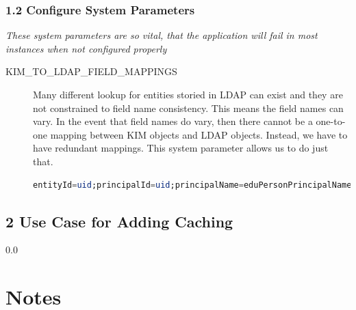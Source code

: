\subsubsection*{1.2 Configure System Parameters}
\emph{These system parameters are so vital, that the application will fail
in most instances when not configured properly}
\begin{description}
\item [KIM\_TO\_LDAP\_FIELD\_MAPPINGS] Many different lookup for
  entities storied in LDAP can exist and they are not constrained to
  field name consistency. This means the field names can vary. In the
  event that field names do vary, then there cannot be a one-to-one
  mapping between KIM objects and LDAP objects. Instead, we have to
  have redundant mappings. This system parameter allows us to do just that.

\begin{lstlisting}[language=sql,basicstyle=\scriptsize,backgroundcolor=\color{ubergray},caption={trnapp-config.xml},frame=single,breaklines=true]
entityId=uid;principalId=uid;principalName=eduPersonPrincipalName;givenName=sn;principals.principalName=eduPersonPrincipalName;persons.principalName=eduPersonPrincipalName;principals.principalId=uid;principals.active=employeeStatus;lastName=sn;firstName=givenName;employmentInformation.employeeStatus=employeeStatus;employmentInformation.employeeId=emplId,facultyId;names.lastName=sn;names.firstName=givenName;employmentInformation.employeeStatusCode=employeeStatus;
\end{lstlisting}
\end{description}

\subsection*{2 Use Case for Adding Caching}

\newpage
{\setlength{\baselineskip}%
  {0.0\baselineskip}
  \section*{Notes}
  \hrulefill \par}